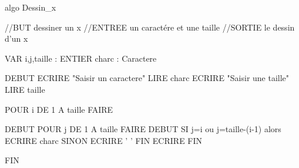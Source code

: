 algo Dessin_x

//BUT  dessiner un x 
//ENTREE    un caractére et une taille
//SORTIE  le dessin d'un x 

VAR 
	i,j,taille : ENTIER
	charc : Caractere
	
DEBUT
	ECRIRE "Saisir un caractere"
	LIRE charc
	ECRIRE "Saisir une taille"
	LIRE taille
	
	POUR i DE 1 A taille FAIRE
	
	DEBUT
			POUR j DE 1 A taille FAIRE
		DEBUT
		SI j=i ou j=taille-(i-1) alors
		ECRIRE charc
		SINON 
		ECRIRE ' '
		FIN
	ECRIRE
	FIN
	
	
FIN
	